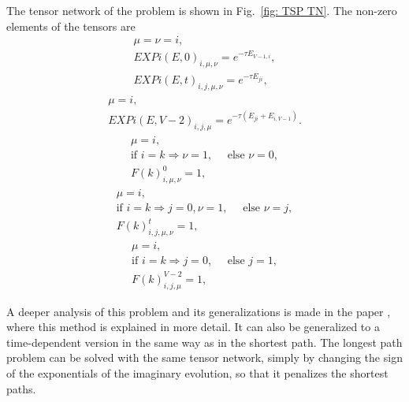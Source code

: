 The tensor network of the problem is shown in Fig.~\ref{fig: TSP TN}. The non-zero elements of the tensors are
\begin{equation}
     \begin{gathered}
         \mu=\nu=i,\\
         EXPi(E,0)_{i,\mu,\nu} = e^{-\tau E_{V-1,i}},\\
         EXPi(E,t)_{i,j,\mu,\nu} = e^{-\tau E_{ji}},
     \end{gathered}
\end{equation}
\begin{equation}
     \begin{gathered}
         \mu=i,\\
         EXPi(E,V-2)_{i,j,\mu} = e^{-\tau (E_{ji}+E_{i,V-1})}.
     \end{gathered}
\end{equation}
\begin{equation}
     \begin{gathered}
         \mu=i,\\
         \text{if } i=k\Rightarrow \nu=1 ,\quad \text{ else } \nu=0,\\
         F(k)^0_{i,\mu,\nu} = 1,
     \end{gathered}
\end{equation}
\begin{equation}
     \begin{gathered}
         \mu=i,\\
         \text{if } i=k\Rightarrow j=0, \nu=1 ,\quad \text{ else } \nu=j,\\
         F(k)^t_{i,j,\mu,\nu} = 1,
     \end{gathered}
\end{equation}
\begin{equation}
     \begin{gathered}
         \mu=i,\\
         \text{if } i=k\Rightarrow j=0,\quad \text{ else } j=1,\\
         F(k)^{V-2}_{i,j,\mu} = 1,
     \end{gathered}
\end{equation}

A deeper analysis of this problem and its generalizations is made in the paper \cite{TSP_TN}, where this method is explained in more detail. It can also be generalized to a time-dependent version in the same way as in the shortest path. The longest path problem can be solved with the same tensor network, simply by changing the sign of the exponentials of the imaginary evolution, so that it penalizes the shortest paths.

